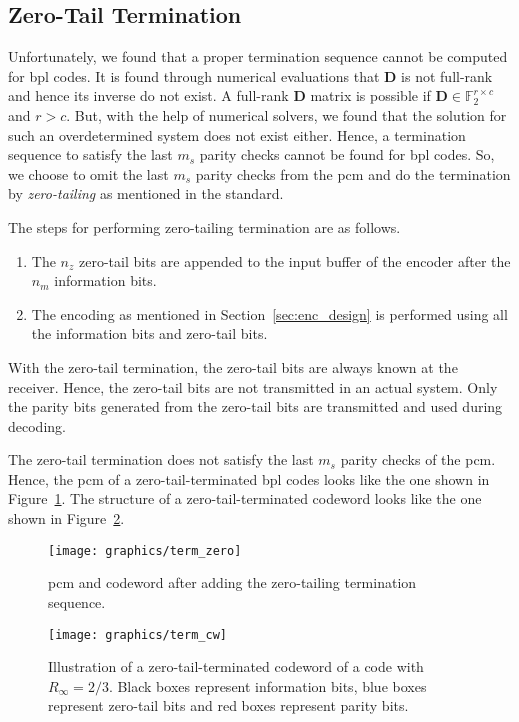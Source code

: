 \subsection{Zero-Tail Termination}
Unfortunately, we found that a proper termination sequence cannot be computed for \gls{bpl} codes. It is found through numerical evaluations that $\mathbf{D}$ is not full-rank and hence its inverse do not exist. A full-rank $\mathbf{D}$ matrix is possible if $\mathbf{D}\in\mathbb{F}_2^{r\times c}$ and $r>c$. But, with the help of numerical solvers, we found that the solution for such an overdetermined system does not exist either. Hence, a termination sequence to satisfy the last $m_s$ parity checks cannot be found for \gls{bpl} codes. So, we choose to omit the last $m_s$ parity checks from the \gls{pcm} and do the termination by \emph{zero-tailing} as mentioned in the standard.

The steps for performing zero-tailing termination are as follows.
\begin{enumerate}
  \item The $n_z$ zero-tail bits are appended to the input buffer of the encoder after the $n_m$ information bits.
  \item The encoding as mentioned in Section~\ref{sec:enc_design} is performed using all the information bits and zero-tail bits.
\end{enumerate}
With the zero-tail termination, the zero-tail bits are always known at the receiver. Hence, the zero-tail bits are not transmitted in an actual system. Only the parity bits generated from the zero-tail bits are transmitted and used during decoding.

The zero-tail termination does not satisfy the last $m_s$ parity checks of the \gls{pcm}. Hence, the \gls{pcm} of a zero-tail-terminated \gls{bpl} codes looks like the one shown in Figure~\ref{fig:pcm_zero}. The structure of a zero-tail-terminated codeword looks like the one shown in Figure~\ref{fig:term_cw}.
\begin{figure}[htbp]
  \centering
  \texttt{[image: graphics/term\_zero]}
  \caption[Illustration of zero-tail termination.]{\gls{pcm} and codeword after adding the zero-tailing termination sequence.}
  \label{fig:pcm_zero}
\end{figure}

\begin{figure}[htbp]
  \centering
  \texttt{[image: graphics/term\_cw]}
  \caption[Illustration of a zero-tail-terminated codeword.]{Illustration of a zero-tail-terminated codeword of a code with $R_\infty=2/3$. Black boxes represent information bits, blue boxes represent zero-tail bits and red boxes represent parity bits.}
  \label{fig:term_cw}
\end{figure}

